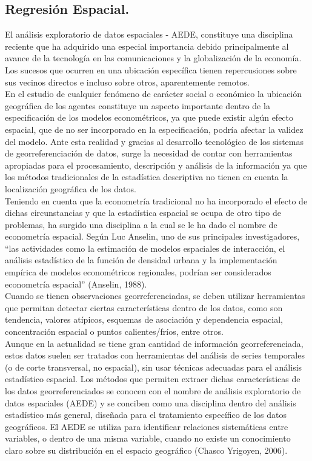 \subsection{Regresión Espacial.}

El análisis exploratorio de datos espaciales - AEDE, constituye una disciplina reciente que ha adquirido una especial importancia debido principalmente al avance de la tecnología en las comunicaciones y la globalización de la economía. Los sucesos que ocurren en una ubicación específica tienen repercusiones sobre sus vecinos directos e incluso sobre otros, aparentemente remotos. \\

En el estudio de cualquier fenómeno de carácter social o económico la ubicación geográfica de los agentes constituye un aspecto importante dentro de la especificación de los modelos econométricos, ya que puede existir algún efecto espacial, que de no ser incorporado en la especificación, podría afectar la validez del modelo. Ante esta realidad y gracias al desarrollo tecnológico de los sistemas de georreferenciación de datos, surge la necesidad de contar con herramientas apropiadas para el procesamiento, descripción y análisis de la información ya que los métodos tradicionales de la estadística descriptiva no tienen en cuenta la localización geográfica de los datos.\\

Teniendo en cuenta que la econometría tradicional no ha incorporado el efecto de dichas circunstancias y que la estadística espacial se ocupa de otro tipo de problemas, ha surgido una disciplina a la cual se le ha dado el nombre de econometría espacial. Según Luc Anselin, uno de sus principales investigadores, “las actividades como la estimación de modelos espaciales de interacción, el análisis estadístico de la función de densidad urbana y la implementación empírica de modelos econométricos regionales, podrían ser considerados econometría espacial” (Anselin, 1988).\\

Cuando se tienen observaciones georreferenciadas, se deben utilizar herramientas que permitan detectar ciertas características dentro de los datos, como son tendencia, valores atípicos, esquemas de asociación y
dependencia espacial, concentración espacial o puntos calientes/fríos, entre otros.\\
Aunque en la actualidad se tiene gran cantidad de información georreferenciada, estos datos suelen ser tratados con herramientas del análisis de series temporales (o de corte transversal, no espacial), sin usar técnicas adecuadas para el análisis estadístico espacial. Los métodos que permiten extraer dichas características de los datos georreferenciados se conocen con el nombre de análisis exploratorio de datos espaciales (AEDE) y se conciben como una disciplina dentro del análisis estadístico más general, diseñada para el tratamiento específico de los datos geográficos. El AEDE se utiliza para identificar relaciones sistemáticas entre variables, o dentro de una misma variable, cuando no existe un conocimiento claro sobre su distribución en el espacio geográfico (Chasco Yrigoyen, 2006).


